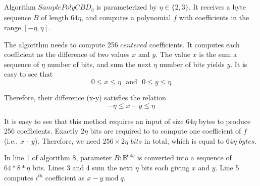 \documentclass[12pt]{article}
\begin{document}
Algorithm $SamplePolyCBD_\eta$ is parameterized by $\eta \in \{2, 3\}$. It receives a byte sequence $B$ of length $64 \eta$, and computes a polynomial $f$ with coefficients in the range $[-\eta, \eta]$.

The algorithm needs to compute 256 $centered$ coefficients. It computes each coefficient as the difference of two values $x$ and $y$. The value $x$ is the sum a sequence of $\eta$ number of bits, and sum the next $\eta$ number of bits yields $y$. It is easy to see that
$$
    0 \le x \le \eta \ \, \operatorname{and} \ \, 0 \le y \le \eta
$$

Therefore, their difference (x-y) satisfies the relation
$$
     -\eta \le x - y \le \eta
$$

It is easy to see that this method requires an input of size $64 \eta$ bytes to produce 256 coefficients. Exactly $2 \eta$ bits are required to to compute one coefficient of $f$ (i.e., $x$ - $y$). Therefore, we need $256 \times 2 \eta$ $bits$ in total, which is equal to $64 \eta$ $bytes$.

In line 1 of algorithm 8, parameter $B: \mathbb{B}^{64\eta}$ is converted into a sequence of $64*8*\eta$ bits. Lines 3 and 4 sum the next $\eta$ bits each giving $x$ and $y$. Line 5 computes $i^{th}$ coefficient as $x-y \operatorname{mod} q$.

\begin{algorithm}[H]
\caption*{\textbf{Annotated Algorithm 8} $\Name{SamplePolyCBD}_\eta(B:\mathbb{B}^{64\eta}) \rightarrow (f:\RingZq$)}
\begin{algorithmic}[1]
\vspace*{1pt}

     {}
     {}
    \vspace*{1pt}
        \vspace*{1pt}
        \vspace*{1pt}
\EndFor

    {}

\end{algorithmic}
\end{algorithm}
\end{document}
